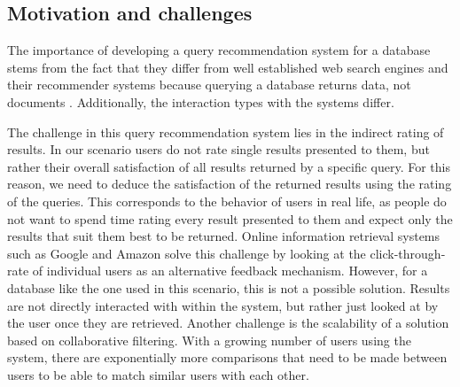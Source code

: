 \documentclass[sigconf]{acmart}
\begin{document}
\subsection{Motivation and challenges}
The importance of developing a query recommendation system for a database stems from the fact that they differ from well established web search engines and their recommender systems because querying a database returns data, not documents \cite{QueryAnalysis}. Additionally, the interaction types with the systems differ.

The challenge in this query recommendation system lies in the indirect rating of results. In our scenario users do not rate single results presented to them, but rather their overall satisfaction of all results returned by a specific query. For this reason, we need to deduce the satisfaction of the returned results using the rating of the queries. This corresponds to the behavior of users in real life, as people do not want to spend time rating every result presented to them and expect only the results that suit them best to be returned. Online information retrieval systems such as Google and Amazon solve this challenge by looking at the click-through-rate of individual users as an alternative feedback mechanism. However, for a database like the one used in this scenario, this is not a possible solution. Results are not directly interacted with within the system, but rather just looked at by the user once they are retrieved.
Another challenge is the scalability of a solution based on collaborative filtering. With a growing number of users using the system, there are exponentially more comparisons that need to be made between users to be able to match similar users with each other.
\end{document}
